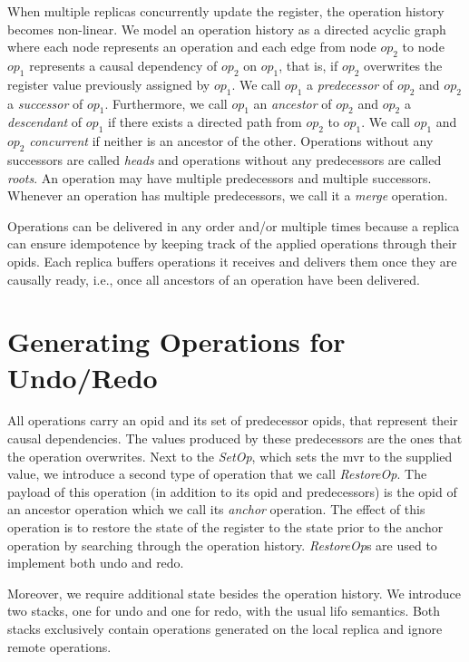 \documentclass[sigplan,natbib=false,review]{acmart}
\newcommand{\op}[3][op]{$\mathit{#1}_{#2}^{#3}$} %
\newcommand{\setopkind}{\textit{SetOp}}
\newcommand{\restopkind}{\textit{RestoreOp}}
\begin{document}
When multiple replicas concurrently update the register,
the operation history becomes non-linear.
We model an operation history as a directed acyclic graph
where each node represents an operation and 
each edge from node \op{2}{} to node \op{1}{}
represents a causal dependency of \op{2}{} on \op{1}{}, that is, if
\op{2}{} overwrites the register value previously assigned by \op{1}{}.
We call \op{1}{} a \emph{predecessor} of \op{2}{} and
\op{2}{} a \emph{successor} of \op{1}{}.
Furthermore, we call \op{1}{} an \emph{ancestor} of \op{2}{} and
\op{2}{} a \emph{descendant} of \op{1}{} if there exists a directed
path from \op{2}{} to \op{1}{}.
We call \op{1}{} and \op{2}{} \emph{concurrent} if neither is an ancestor of the
other.
Operations without any successors are called \emph{heads} and
operations without any predecessors are called \emph{roots}.
An operation may have multiple predecessors and multiple successors.
Whenever an operation has multiple predecessors, we call it a \emph{merge} operation.

Operations can be delivered in any order and/or multiple
times because a replica can ensure idempotence by
keeping track of the applied operations through their \glspl*{opid}.
Each replica buffers operations it receives and delivers them
once they are causally ready, i.e., once all ancestors of an operation
have been delivered.

\section{Generating Operations for Undo/Redo}\label{sec:overview}

All operations carry an \gls*{opid} and its set of predecessor \glspl*{opid},
that represent their causal dependencies.
The values produced by these predecessors are the ones that the operation
overwrites.
Next to the \setopkind{}, which sets the \gls{mvr} to the supplied value,
we introduce a second type of operation that we call \restopkind{}.
The payload of this operation (in addition to its \gls*{opid} and predecessors)
is the \gls*{opid} of an ancestor operation which we call its
\emph{anchor} operation.
The effect of this operation is to restore the state of the register to the
state prior to the anchor operation by searching through the operation history.
\restopkind{}s are used to implement both undo and redo.

Moreover, we require additional state besides the operation history.
We introduce two stacks, one for undo and one for redo, with the usual
\acrlong{lifo} semantics.
Both stacks exclusively contain operations generated on the local replica and
ignore remote operations.
\end{document}
